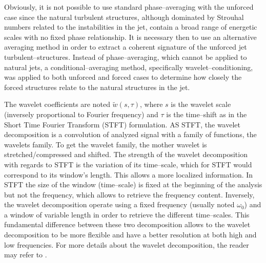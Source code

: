 Obviously, it is not possible to use standard phase--averaging with the unforced case since the natural turbulent structures, although dominated by Strouhal numbers related to the instabilities in the jet, contain a broad range of energetic scales with no fixed phase relationship. It is necessary then to use an alternative averaging method in order to extract a coherent signature of the unforced jet turbulent--structures.
Instead of phase--averaging, which cannot be applied to natural jets, a conditional--averaging method, specifically wavelet--conditioning, was applied to both unforced and forced cases to determine how closely the forced structures relate to the natural structures in the jet.

The wavelet coefficients are noted $\tilde{w} \left( s, \tau \right)$, where $s$ is the wavelet scale (inversely proportional to Fourier frequency) and $\tau$ is the time--shift as in the Short Time Fourier Transform (STFT) formulation. AS STFT, the wavelet decomposition is a convolution of analyzed signal with a family of functions, the wavelets family. To get the wavelet family, the mother wavelet is stretched/compressed and shifted. The strength of the wavelet decomposition with regards to STFT is the variation of its time--scale, which for STFT would correspond to its window's length. This allows a more localized information. In STFT the size of the window (time--scale) is fixed at the beginning of the analysis but not the frequency, which allows to retrieve the frequency content. Inversely, the wavelet decomposition operate using a fixed frequency (usually noted $\omega_0$) and a window of variable length in order to retrieve the different time--scales. This fundamental difference between these two decomposition allows to the wavelet decomposition to be more flexible and have a better resolution at both high and low frequencies. For more details about the wavelet decomposition, the reader may refer to \citet{Farge1992}.


